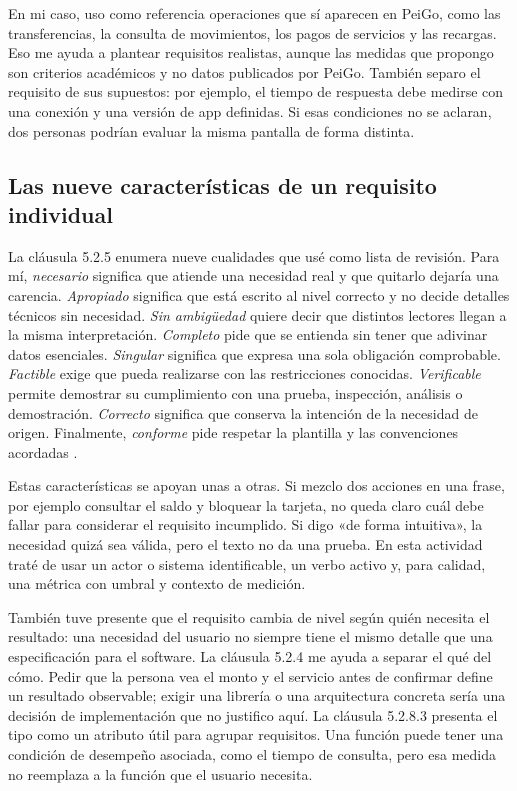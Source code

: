 \documentclass[10pt,letterpaper]{article}
\begin{document}
En mi caso, uso como referencia operaciones que sí aparecen en PeiGo, como las transferencias, la consulta de movimientos, los pagos de servicios y las recargas. Eso me ayuda a plantear requisitos realistas, aunque las medidas que propongo son criterios académicos y no datos publicados por PeiGo. También separo el requisito de sus supuestos: por ejemplo, el tiempo de respuesta debe medirse con una conexión y una versión de app definidas. Si esas condiciones no se aclaran, dos personas podrían evaluar la misma pantalla de forma distinta.

\subsection{Las nueve características de un requisito individual}
La cláusula 5.2.5 enumera nueve cualidades que usé como lista de revisión. Para mí, \textit{necesario} significa que atiende una necesidad real y que quitarlo dejaría una carencia. \textit{Apropiado} significa que está escrito al nivel correcto y no decide detalles técnicos sin necesidad. \textit{Sin ambigüedad} quiere decir que distintos lectores llegan a la misma interpretación. \textit{Completo} pide que se entienda sin tener que adivinar datos esenciales. \textit{Singular} significa que expresa una sola obligación comprobable. \textit{Factible} exige que pueda realizarse con las restricciones conocidas. \textit{Verificable} permite demostrar su cumplimiento con una prueba, inspección, análisis o demostración. \textit{Correcto} significa que conserva la intención de la necesidad de origen. Finalmente, \textit{conforme} pide respetar la plantilla y las convenciones acordadas \cite[cl. 5.2.5]{iso29148}.

Estas características se apoyan unas a otras. Si mezclo dos acciones en una frase, por ejemplo consultar el saldo y bloquear la tarjeta, no queda claro cuál debe fallar para considerar el requisito incumplido. Si digo «de forma intuitiva», la necesidad quizá sea válida, pero el texto no da una prueba. En esta actividad traté de usar un actor o sistema identificable, un verbo activo y, para calidad, una métrica con umbral y contexto de medición.

También tuve presente que el requisito cambia de nivel según quién necesita el resultado: una necesidad del usuario no siempre tiene el mismo detalle que una especificación para el software. La cláusula 5.2.4 me ayuda a separar el qué del cómo. Pedir que la persona vea el monto y el servicio antes de confirmar define un resultado observable; exigir una librería o una arquitectura concreta sería una decisión de implementación que no justifico aquí. La cláusula 5.2.8.3 presenta el tipo como un atributo útil para agrupar requisitos. Una función puede tener una condición de desempeño asociada, como el tiempo de consulta, pero esa medida no reemplaza a la función que el usuario necesita.
\end{document}
